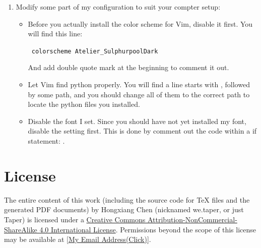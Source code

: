 \documentclass{article}
\newcommand\command[1]{\texttt{\centering #1}}
\begin{document}
\begin{enumerate}
\begin{enumerate}
            \item Modify some part of my configuration to suit your
                compter setup:
                \begin{itemize}
                    \item Before you actually install the color scheme
                        for Vim, disable it first. You will find this line:

                        \command{ colorscheme~Atelier\_SulphurpoolDark }

                        And add double quote mark at the beginning to
                        comment it out.
                    \item Let Vim find python properly. You will find
                        a line starts with ,
                        followed by some path, and you should change
                        all of them to the correct path to locate the
                        python files you installed.
                    \item Disable the font I set. Since you should
                        have not yet installed my font, disable the
                        setting first. This is done by comment out the
                        code within a if statement: .
                \end{itemize}
        \end{enumerate}
        
\end{enumerate}
% 

\printnomenclature
\section{License}
The entire content of this work (including the source code
for TeX files and the generated PDF documents) by 
Hongxiang Chen (nicknamed we.taper, or just Taper) is
licensed under a 
\href{http://creativecommons.org/licenses/by-nc-sa/4.0/}{Creative 
Commons Attribution-NonCommercial-ShareAlike 4.0 International 
License}. Permissions beyond the scope of this 
license may be available at 
\href{http://www.google.com/recaptcha/mailhide/d?k=015LguzBJigi0rpyuJRqLoig==\&c=p1c-M-mm7ZcjUCkTuZZa9eEPHRVk6paN0694iazlQy8=}
{[My Email Address(Click)]}.
\end{document}
